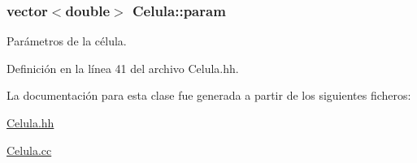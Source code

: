 \hypertarget{class_celula_a386c6da3af12b5662e3866675d60a4b7}{
\subsubsection[{param}]{\setlength{\rightskip}{0pt plus 5cm}vector$<$double$>$ Celula\+::param\hspace{0.3cm}{\ttfamily [private]}}}\label{class_celula_a386c6da3af12b5662e3866675d60a4b7}


Parámetros de la célula. 



Definición en la línea 41 del archivo Celula.\+hh.



La documentación para esta clase fue generada a partir de los siguientes ficheros\+:\begin{DoxyCompactItemize}
\item 
\hyperlink{_celula_8hh}{Celula.\+hh}\item 
\hyperlink{_celula_8cc}{Celula.\+cc}\end{DoxyCompactItemize}
